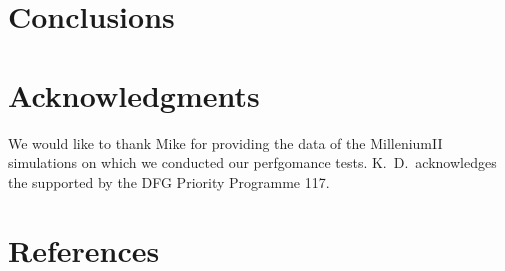 \section{Conclusions}
\label{conclusions}

\section*{Acknowledgments}
We would like to thank Mike for providing the data of the MilleniumII simulations 
on which we conducted our perfgomance tests. K.~D.~acknowledges the
supported by the DFG Priority Programme 117.

\section*{References}
















